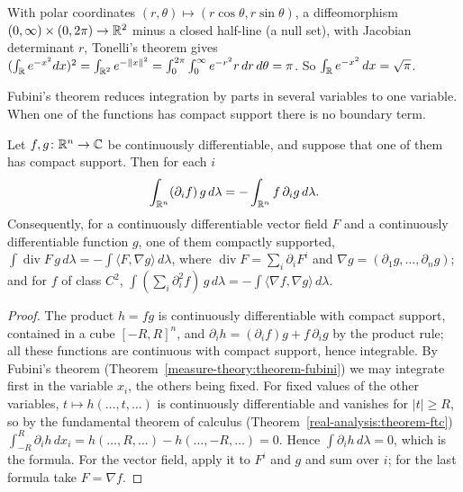 \begin{example}\label{measure-theory:example-gaussian}
With polar coordinates $(r, \theta) \mapsto (r\cos\theta, r\sin\theta)$, a diffeomorphism $(0, \infty) \times (0, 2\pi) \to \mathbb{R}^2$ minus a closed half-line (a null set), with Jacobian determinant $r$,
Tonelli's theorem gives $(\int_{\mathbb{R}} e^{-x^2}dx)^2 = \int_{\mathbb{R}^2}e^{-\|x\|^2} = \int_0^{2\pi}\int_0^\infty e^{-r^2}r\,dr\,d\theta = \pi$. So $\int_{\mathbb{R}} e^{-x^2}\,dx = \sqrt{\pi}$.
\end{example}

Fubini's theorem reduces integration by parts in several variables to one variable. When one of the functions has compact support there is no boundary term.

\begin{proposition}\label{measure-theory:proposition-integration-by-parts}
Let $f, g \colon \mathbb{R}^n \to \mathbb{C}$ be continuously differentiable, and suppose that one of them has compact support. Then for each $i$
\[
\int_{\mathbb{R}^n}(\partial_if)\,g\,d\lambda = -\int_{\mathbb{R}^n}f\,\partial_ig\,d\lambda .
\]
Consequently, for a continuously differentiable vector field $F$ and a continuously differentiable function $g$, one of them compactly supported,
$\int\operatorname{div}F\,g\,d\lambda = -\int\langle F, \nabla g\rangle\,d\lambda$, where $\operatorname{div}F = \sum_i\partial_iF^i$ and $\nabla g = (\partial_1g, \ldots, \partial_ng)$; and for $f$ of class $C^2$,
$\int(\sum_i\partial_i^2f)\,g\,d\lambda = -\int\langle\nabla f, \nabla g\rangle\,d\lambda$.
\end{proposition}

\begin{proof}
The product $h = fg$ is continuously differentiable with compact support, contained in a cube $[-R, R]^n$, and $\partial_ih = (\partial_if)g + f\,\partial_ig$ by the product rule; all these functions are
continuous with compact support, hence integrable. By Fubini's theorem (Theorem~\ref{measure-theory:theorem-fubini}) we may integrate first in the variable $x_i$, the others being fixed. For fixed
values of the other variables, $t \mapsto h(\ldots, t, \ldots)$ is continuously differentiable and vanishes for $|t| \geq R$, so by the fundamental theorem of calculus
(Theorem~\ref{real-analysis:theorem-ftc}) $\int_{-R}^R\partial_ih\,dx_i = h(\ldots, R, \ldots) - h(\ldots, -R, \ldots) = 0$. Hence $\int\partial_ih\,d\lambda = 0$, which is the formula. For the vector field,
apply it to $F^i$ and $g$ and sum over $i$; for the last formula take $F = \nabla f$.
\end{proof}

